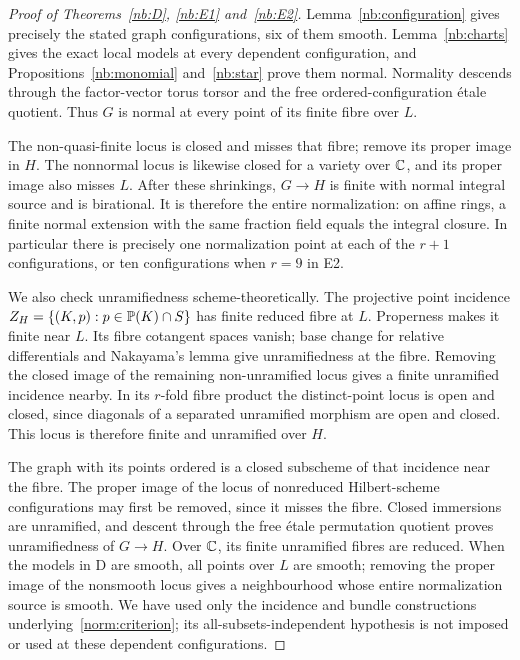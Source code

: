 \begin{proof}[Proof of Theorems~\ref{nb:D}, \ref{nb:E1} and~\ref{nb:E2}]
Lemma~\ref{nb:configuration} gives precisely the stated graph
configurations, six of them smooth. Lemma~\ref{nb:charts} gives
the exact local models at every dependent configuration, and
Propositions~\ref{nb:monomial} and~\ref{nb:star} prove them normal.
Normality descends through the factor-vector torus torsor and the
free ordered-configuration \'etale quotient. Thus $G$ is normal at
every point of its finite fibre over $L$.

The non-quasi-finite locus is closed and misses that fibre; remove
its proper image in $H$. The nonnormal locus is likewise closed
for a variety over $\mathbb C$, and its proper image also misses $L$.
After these shrinkings, $G\to H$ is finite with normal integral
source and is birational. It is therefore the entire normalization:
on affine rings, a finite normal extension with the same fraction
field equals the integral closure. In particular there is precisely
one normalization point at each of the $r+1$ configurations, or
ten configurations when $r=9$ in E2.

We also check unramifiedness scheme-theoretically. The projective
point incidence $Z_H=\{(K,p):p\in\mathbb P(K)\cap S\}$ has finite
reduced fibre at $L$. Properness makes it finite near $L$. Its fibre
cotangent spaces vanish; base change for relative differentials and
Nakayama's lemma give unramifiedness at the fibre. Removing the
closed image of the remaining non-unramified locus gives a finite
unramified incidence nearby. In its $r$-fold fibre product the
distinct-point locus is open and closed, since diagonals of a
separated unramified morphism are open and closed. This locus is
therefore finite and unramified over $H$.

The graph with its points ordered is a closed subscheme of that
incidence near the fibre. The proper image of the locus of nonreduced
Hilbert-scheme configurations may first be removed, since it misses
the fibre. Closed immersions are unramified, and descent through the
free \'etale permutation quotient proves unramifiedness of $G\to H$.
Over $\mathbb C$, its finite unramified fibres are reduced. When the models
in D are smooth, all points over $L$ are smooth; removing the proper
image of the nonsmooth locus gives a neighbourhood whose entire
normalization source is smooth. We have used only the incidence and
bundle constructions underlying~\ref{norm:criterion}; its
all-subsets-independent hypothesis is not imposed or used at these
dependent configurations.


\end{proof}
